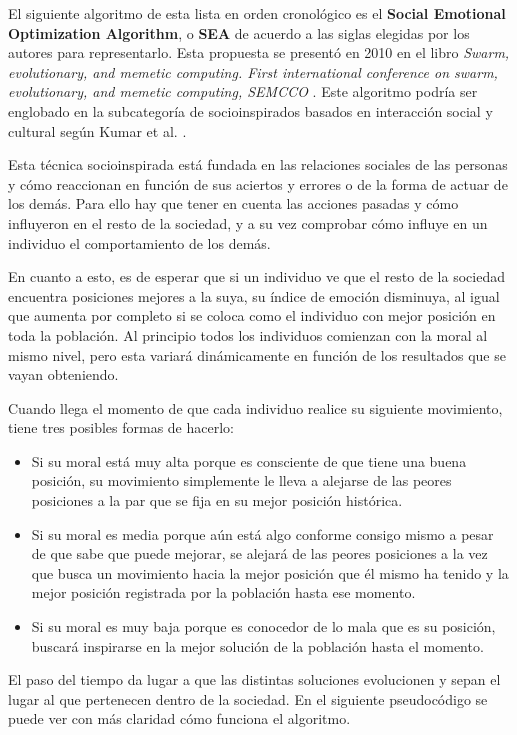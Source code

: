 El siguiente algoritmo de esta lista en orden cronológico es el \textbf{Social Emotional Optimization Algorithm}, o \textbf{SEA} de acuerdo a las siglas elegidas por los autores \cite{sea-chapter} para representarlo. Esta propuesta se presentó en 2010 en el libro \textit{Swarm, evolutionary, and memetic computing. First international conference on swarm, evolutionary, and memetic computing, SEMCCO} \cite{sea-book}. Este algoritmo podría ser englobado en la subcategoría de socioinspirados basados en interacción social y cultural según Kumar et al. \cite{socio-evolution-algorithm}.

Esta técnica socioinspirada está fundada en las relaciones sociales de las personas y cómo reaccionan en función de sus aciertos y errores o de la forma de actuar de los demás. Para ello hay que tener en cuenta las acciones pasadas y cómo influyeron en el resto de la sociedad, y a su vez comprobar cómo influye en un individuo el comportamiento de los demás.

En cuanto a esto, es de esperar que si un individuo ve que el resto de la sociedad encuentra posiciones mejores a la suya, su índice de emoción disminuya, al igual que aumenta por completo si se coloca como el individuo con mejor posición en toda la población. Al principio todos los individuos comienzan con la moral al mismo nivel, pero esta variará dinámicamente en función de los resultados que se vayan obteniendo.

Cuando llega el momento de que cada individuo realice su siguiente movimiento, tiene tres posibles formas de hacerlo:

\begin{itemize}
	\item Si su moral está muy alta porque es consciente de que tiene una buena posición, su movimiento simplemente le lleva a alejarse de las peores posiciones a la par que se fija en su mejor posición histórica.
	\item Si su moral es media porque aún está algo conforme consigo mismo a pesar de que sabe que puede mejorar, se alejará de las peores posiciones a la vez que busca un movimiento hacia la mejor posición que él mismo ha tenido y la mejor posición registrada por la población hasta ese momento.
	\item Si su moral es muy baja porque es conocedor de lo mala que es su posición, buscará inspirarse en la mejor solución de la población hasta el momento.
\end{itemize}

El paso del tiempo da lugar a que las distintas soluciones evolucionen y sepan el lugar al que pertenecen dentro de la sociedad. En el siguiente pseudocódigo se puede ver con más claridad cómo funciona el algoritmo.

